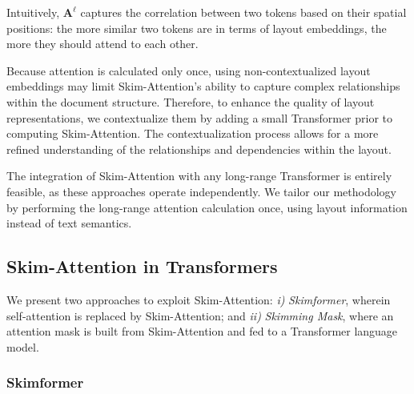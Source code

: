 Intuitively, $\bm{A}^{\ell}$ captures the correlation between two tokens based on their spatial positions: the more similar two tokens are in terms of layout embeddings, the more they should attend to each other. 

Because attention is calculated only once, using non-contextualized layout embeddings may limit Skim-Attention's ability to capture complex relationships within the document structure. Therefore, to enhance the quality of layout representations, we contextualize them by adding a small Transformer prior to computing Skim-Attention. The contextualization process allows for a more refined understanding of the relationships and dependencies within the layout.

The integration of Skim-Attention with any long-range Transformer is entirely feasible, as these approaches operate independently. We tailor our methodology by performing the long-range attention calculation once, using layout information instead of text semantics.

\subsection{Skim-Attention in Transformers}

We present two approaches to exploit Skim-Attention:
\emph{i)} \textit{Skimformer}, wherein self-attention is replaced by Skim-Attention; and \emph{ii)} \textit{Skimming Mask}, where an attention mask is built from Skim-Attention and fed to a Transformer language model.

\subsubsection{Skimformer}

